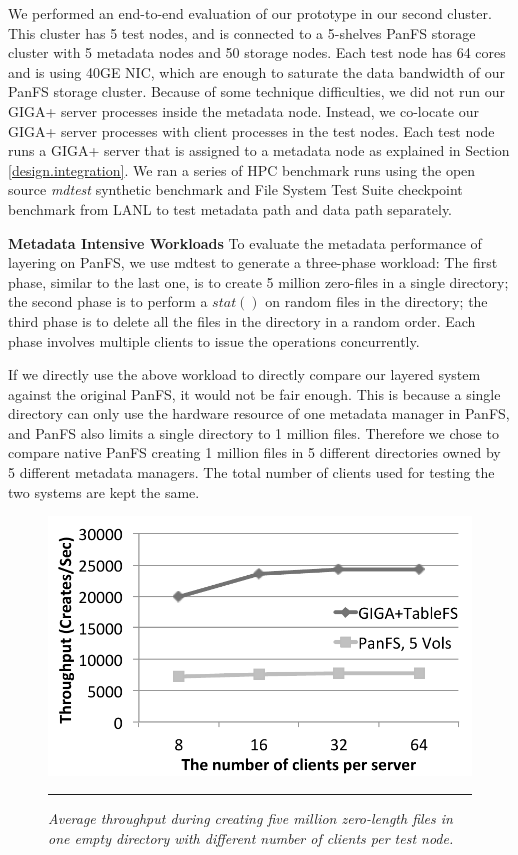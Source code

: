 We performed an end-to-end evaluation of our prototype in our second cluster.
This cluster has 5 test nodes, and is connected to
a 5-shelves PanFS storage cluster with 5 metadata nodes and 50 storage nodes.
Each test node has 64 cores and is using 40GE NIC, which are enough
to saturate the data bandwidth of our PanFS storage cluster.
Because of some technique difficulties,
we did not run our GIGA+ server processes inside the metadata node.
Instead, we co-locate our GIGA+ server processes
with client processes in the test nodes.
Each test node runs a GIGA+ server that is assigned to a metadata node
as explained in Section \ref{design.integration}.
We ran a series of HPC benchmark runs using the open source \textit{mdtest}
synthetic benchmark \cite{mdtest}
and File System Test Suite checkpoint benchmark from LANL \cite{mpiio}
to test metadata path and data path separately.

\textbf{Metadata Intensive Workloads}
To evaluate the metadata performance of layering on PanFS,
we use mdtest to generate a three-phase workload:
The first phase, similar to the last one, is to create 5 million
zero-files in a single directory;
the second phase is to perform a $stat()$ on random files in the directory;
the third phase is to delete all the files in the directory in a random order.
Each phase involves multiple clients to issue the operations concurrently.

If we directly use the above workload to directly compare our layered system
against the original PanFS, it would not be fair enough.
This is because a single directory can only use the hardware resource
of one metadata manager in PanFS,
and PanFS also limits a single directory to 1 million files.
Therefore we chose to compare native PanFS creating 1 million files
in 5 different directories owned by 5 different metadata managers.
The total number of clients used for testing the two systems
are kept the same.


\begin{figure}[t]  %
\centerline{\includegraphics[scale=0.7]{./figs/zero_file_creation_on_panfs}}
\vspace{10pt}
\caption{\normalsize
\textit{Average throughput during creating five million zero-length files
in one empty directory with different number of clients per test node.}
}
\vspace{10pt}
\hrule
\label{graph:creation_clients}
\end{figure}       %

